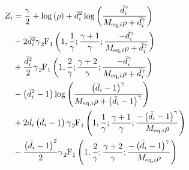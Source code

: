 \begin{equation} \label{eq:zi_appendix}
\begin{aligned}
    Z_i &= \frac{\gamma}{2} + \log\left(\rho\right) + \bar{d}_i^2\log\left(
    \frac{\bar{d}_i^{\gamma}}{\Meqi \rho + \bar{d}_i^{\gamma}}\right)\\
    &- 2 \bar{d}_i^2\gamma \hgeo \left(1,\frac{1}{\gamma};
    \frac{\gamma+1}{\gamma};\frac{-\bar{d}_i^{\gamma}}{\Meqi\rho +
    \bar{d}_i^{\gamma}}\right)\\
    &+ \frac{\bar{d}_i^2}{2}\gamma \hgeo\left(1, \frac{2}{\gamma};
    \frac{\gamma+2}{\gamma};\frac{-\bar{d}_i^{\gamma}}{\Meqi\rho +
    \bar{d}_i^{\gamma}}\right)\\
    &- \left(\bar{d}_i^2-1\right)\log\left(
    \frac{\left(\bar{d}_i-1\right)^{\gamma}}
    {\Meqi\rho+\left(\bar{d}_i - 1\right)^{\gamma}}\right)\\
    &+ 2\bar{d}_i\left(\bar{d}_i - 1\right)\gamma\hgeo\left(1,\frac{1}{\gamma};
    \frac{\gamma + 1}{\gamma};\frac{-\left(\bar{d}_i-1\right)^{\gamma}}
    {\Meqi\rho}\right)\\
    &- \frac{\left(\bar{d}_i-1\right)^2}{2}\gamma\hgeo\left(1,\frac{2}{\gamma};
    \frac{\gamma + 2}{\gamma};\frac{-\left(\bar{d}_i-1\right)^{\gamma}}
    {\Meqi\rho}\right)
\end{aligned}
\end{equation}


